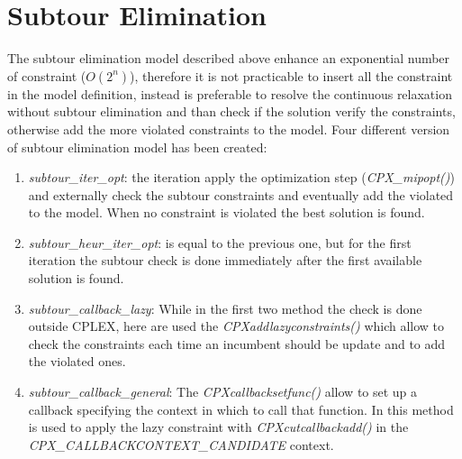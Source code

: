 \section{Subtour Elimination}\label{sec:subtour}
The subtour elimination model described above enhance an exponential number of constraint ($ O(2^n) $), therefore it is not practicable to insert all the constraint in the model definition, instead is preferable to resolve the continuous relaxation without subtour elimination and than check if the solution verify the constraints, otherwise add the more violated constraints to the model. Four different version of subtour elimination model has been created:
\begin{enumerate}
	\item \textit{subtour\_iter\_opt}: the iteration apply the optimization step (\textit{CPX\_mipopt()}) and externally check the subtour constraints and eventually add the violated to the model. When no constraint is violated the best solution is found.
	\item \textit{subtour\_heur\_iter\_opt}: is equal to the previous one, but for the first iteration the subtour check is done immediately after the first available solution is found.
	\item \textit{subtour\_callback\_lazy}: While in the first two method the check is done outside CPLEX, here are used the \textit{CPXaddlazyconstraints()} which allow to check the constraints each time an incumbent should be update and to add the violated ones.
	\item \textit{subtour\_callback\_general}: The \textit{CPXcallbacksetfunc()} allow to set up a callback specifying the context in which to call that function. In this method is used to apply the lazy constraint with \textit{CPXcutcallbackadd()} in the \textit{CPX\_CALLBACKCONTEXT\_CANDIDATE} context.
\end{enumerate} 

